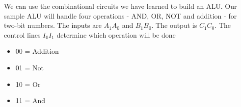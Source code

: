 \documentclass{report}
\begin{document}
\begin{itemize}
            \bigbreak \noindent 
            We can use the combinational circuits we have learned to build an ALU. Our sample ALU will handle four operations - AND, OR, NOT and addition - for two-bit numbers.
            \bigbreak \noindent 
            The inputs are $A_{1}A_{0}$ and $B_{1}B_{0}$. The output is $C_{1}C_{0} $.
            \bigbreak \noindent 
            The control lines $I_{0}I_{1}$ determine which operation will be done
            \begin{itemize}
                \item 00 = Addition
                \item 01 = Not
                \item 10 = Or 
                \item 11 = And
            \end{itemize}
            \bigbreak \noindent 
    \end{itemize}

    \pagebreak 
\end{document}
